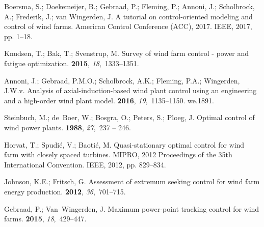 \documentclass[energies,article,submit,moreauthors,latex,10pt,a4paper]{mdpi}
\begin{document}
\begin{thebibliography}{999}
	\providecommand{\natexlab}[1]{#1}
	
	Boersma, S.; Doekemeijer, B.; Gebraad, P.; Fleming, P.; Annoni, J.; Scholbrock,
	A.; Frederik, J.; van Wingerden, J.
	\newblock A tutorial on control-oriented modeling and control of wind farms.
	\newblock  American Control Conference (ACC), 2017. IEEE,  2017, pp. 1--18.
	
	Knudsen, T.; Bak, T.; Svenstrup, M.
	\newblock Survey of wind farm control - power and fatigue optimization.
	 {\bf 2015}, {\em 18},~1333--1351.
	
	Annoni, J.; Gebraad, P.M.O.; Scholbrock, A.K.; Fleming, P.A.; Wingerden, J.W.v.
	\newblock Analysis of axial-induction-based wind plant control using an
	engineering and a high-order wind plant model.
	 {\bf 2016}, {\em 19},~1135--1150.
	\newblock we.1891.
	
	Steinbuch, M.; de~Boer, W.; Bosgra, O.; Peters, S.; Ploeg, J.
	\newblock Optimal control of wind power plants.
	 {\bf
		1988}, {\em 27},~237 -- 246.
	
	Horvat, T.; Spudi{\'c}, V.; Baoti{\'c}, M.
	\newblock Quasi-stationary optimal control for wind farm with closely spaced
	turbines.
	\newblock  MIPRO, 2012 Proceedings of the 35th International Convention. IEEE,
	2012, pp. 829--834.
	
	Johnson, K.E.; Fritsch, G.
	\newblock Assessment of extremum seeking control for wind farm energy
	production.
	 {\bf 2012}, {\em 36},~701--715.
	
	Gebraad, P.; Van~Wingerden, J.
	\newblock Maximum power-point tracking control for wind farms.
	 {\bf 2015}, {\em 18},~429--447.
	

\end{thebibliography}
\end{document}
